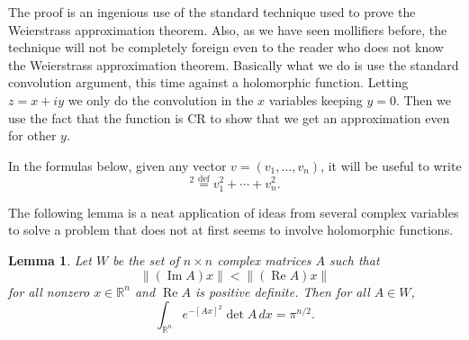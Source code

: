 \documentclass[12pt,openany]{book}
\renewcommand{\Re}{\operatorname{Re}}
\renewcommand{\Im}{\operatorname{Im}}
\newcommand{\snorm}[1]{\lVert {#1} \rVert}
\newcommand{\R}{{\mathbb{R}}}
\theoremstyle{plain}
\newtheorem{lemma}[thm]{Lemma}
\theoremstyle{remark}
\theoremstyle{definition}
\theoremstyle{exercise}
\theoremstyle{example}
\begin{document}
The proof is an ingenious 
use of the standard technique used to prove the Weierstrass approximation
theorem.  Also, as we have seen mollifiers before, the technique will not be
completely foreign even to the reader who does not know the Weierstrass
approximation theorem.  Basically what we do is use the standard convolution
argument, this time against a holomorphic function.  Letting $z=x+iy$
we only do the convolution in the
$x$ variables keeping $y=0$.  Then we use the fact that the
function is CR to show that we get an approximation even for other $y$.

In the formulas below, given any vector $v = (v_1,\ldots,v_n)$,
it will be useful to write
%
\begin{equation*}
[v]^2 \overset{\text{def}}{=} v_1^2 + \cdots + v_n^2 .
\end{equation*}

The following lemma is a neat application of ideas from several complex
variables to solve a problem that does not at first seems to involve
holomorphic functions.

\begin{lemma} \label{lemma:matrixint}
Let $W$ be the set of $n \times n$ complex matrices $A$ such that
\begin{equation*}
\snorm{(\Im A)x} < \snorm{(\Re A)x}
\end{equation*}
for all nonzero $x \in \R^n$ and $\Re A$ is positive definite.
Then for all $A \in W$,
\begin{equation*}
\int_{\R^n} e^{-{[Ax]}^2} \det A \, dx  = \pi^{n/2} .
\end{equation*}
\end{lemma}
\end{document}
